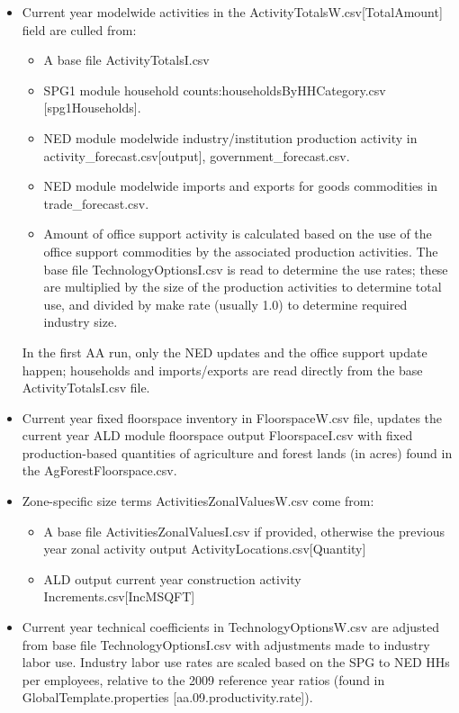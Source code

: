 \begin{itemize}
\item Current year modelwide activities in the ActivityTotalsW.csv[TotalAmount] field are culled from:
\begin{itemize}
\item A base file ActivityTotalsI.csv
\item SPG1 module household counts:householdsByHHCategory.csv [spg1Households]. 
\item NED module modelwide industry/institution production activity in activity\_forecast.csv[output], government\_forecast.csv.
\item NED module modelwide imports and exports for goods commodities in trade\_forecast.csv.
\item Amount of office support activity is calculated based on the use of the office support commodities by the associated production activities. The base file TechnologyOptionsI.csv is read to determine the use rates; these are multiplied by the size of the production activities to determine total use, and divided by make rate (usually 1.0) to determine required industry size.
\end{itemize}
In the first AA run, only the NED updates and the office support update happen; households and imports/exports are read directly from the base ActivityTotalsI.csv file.

\item Current year fixed floorspace inventory in FloorspaceW.csv file, updates the current year ALD module floorspace output FloorspaceI.csv with fixed production-based quantities of agriculture and forest lands (in acres) found in the AgForestFloorspace.csv.
\item Zone-specific size terms ActivitiesZonalValuesW.csv come from:
\begin{itemize}
\item A base file ActivitiesZonalValuesI.csv if provided, otherwise the previous year zonal activity output ActivityLocations.csv[Quantity]
\item ALD output current year construction activity Increments.csv[IncMSQFT]
\end{itemize}
\item Current year technical coefficients in TechnologyOptionsW.csv are adjusted from base file TechnologyOptionsI.csv with adjustments made to industry labor use. Industry labor use rates are scaled based on the SPG to NED HHs per employees, relative to the 2009 reference year ratios (found in GlobalTemplate.properties [aa.09.productivity.rate]).
\end{itemize}

